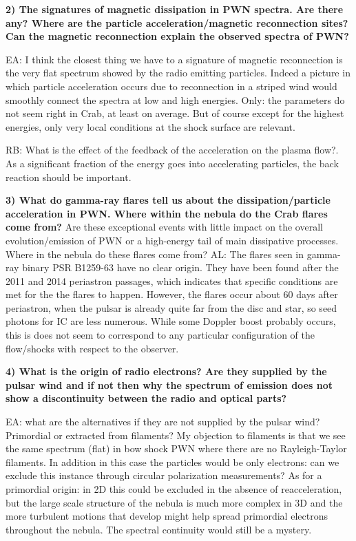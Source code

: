 \textbf{2) The signatures of magnetic dissipation in PWN spectra. Are there any?  Where are the particle acceleration/magnetic reconnection sites? Can the magnetic reconnection explain the observed spectra of PWN? }

EA: I think the closest thing we have to a signature of magnetic reconnection is the very flat spectrum showed by the radio emitting particles. Indeed a picture in which particle acceleration occurs due to reconnection in a striped wind would smoothly connect the spectra at low and high energies. Only: the parameters do not seem right in Crab, at least on average. But of course except for the highest energies, only very local conditions at the shock surface are relevant.

RB: What is the effect of the feedback of the acceleration on the plasma flow?. As a significant fraction of the energy goes into accelerating particles, the back reaction should be important.

\textbf{3) What do gamma-ray flares tell us about the dissipation/particle acceleration in PWN. Where within the nebula do the Crab flares come from? }
Are these exceptional events with little impact on the overall evolution/emission of PWN or a high-energy tail of main dissipative processes. Where in the nebula do these flares come from? 
AL: The flares seen in gamma-ray binary PSR B1259-63 have no clear origin.  They have been found after the  2011 and 2014 periastron passages, which indicates that specific conditions are met for the the flares to happen. However, the flares occur about 60 days after periastron, when the pulsar is already quite far from the disc and star, so seed photons for IC are less numerous. While some Doppler boost probably occurs, this is does not seem to correspond to any particular configuration of the flow/shocks with respect to the observer.

\textbf{4) What is the origin of radio electrons? Are they supplied by the pulsar wind and if not then why the spectrum of emission does not show a discontinuity between the radio and optical parts? }

EA: what are the alternatives if they are not supplied by the pulsar wind? Primordial or extracted from filaments? My objection to filaments is that we see the same spectrum (flat) in bow shock PWN where there are no Rayleigh-Taylor filaments. In addition in this case the particles would be only electrons: can we exclude this instance through circular polarization measurements? As for a primordial origin: in 2D this could be excluded in the absence of reacceleration, but the large scale structure of the nebula is much more complex in 3D and the more turbulent motions that develop might help spread primordial electrons throughout the nebula. The spectral continuity would still be a mystery.


